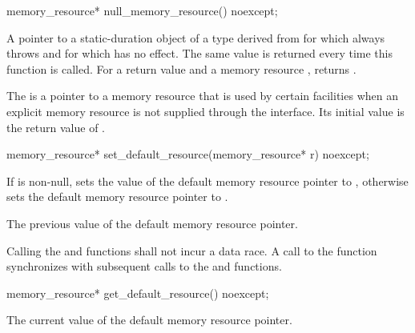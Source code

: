 %
\begin{itemdecl}
memory_resource* null_memory_resource() noexcept;
\end{itemdecl}

\begin{itemdescr}
\pnum
\returns
A pointer to a static-duration object of a type derived from 
for which  always throws  and
for which  has no effect.
The same value is returned every time this function is called.
For a return value  and a memory resource ,
 returns .
\end{itemdescr}

\pnum
The  is a pointer to a memory resource
that is used by certain facilities when an explicit memory resource
is not supplied through the interface.
Its initial value is the return value of .

%
\begin{itemdecl}
memory_resource* set_default_resource(memory_resource* r) noexcept;
\end{itemdecl}

\begin{itemdescr}
\pnum
\effects
If  is non-null,
sets the value of the default memory resource pointer to ,
otherwise sets the default memory resource pointer to .

\pnum
\returns
The previous value of the default memory resource pointer.

\pnum
\remarks
Calling the  and
 functions shall not incur a data race.
A call to the  function
synchronizes with subsequent calls to
the  and  functions.
\end{itemdescr}

%
\begin{itemdecl}
memory_resource* get_default_resource() noexcept;
\end{itemdecl}

\begin{itemdescr}
\pnum
\returns
The current value of the default memory resource pointer.
\end{itemdescr}

